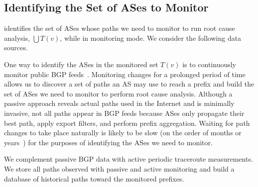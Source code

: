 \subsection{Identifying the Set of ASes to Monitor}
\label{subsec:candidates}

\ouralgo identifies the set of ASes whose paths we need to monitor to
run root cause analysis, $\bigcup{}T(v)$, while in monitoring mode. We
consider the following data sources.

 One way to
identify the ASes in the monitored set $T(v)$ is to continuously monitor
public BGP feeds~\cite{routeviews}.  Monitoring changes for a prolonged
period of time allows us to discover a set of paths an AS may use to
reach a prefix and build the set of ASes we need to monitor to perform
root cause analysis.  Although a passive approach reveals actual paths
used in the Internet and is minimally invasive, not all paths appear in
BGP feeds because ASes only propagate their best path, apply export
filters, and perform prefix aggregation.  Waiting for path
changes to take place naturally is likely to be slow (on the order of months or years~\cite{as-completeness}) 
for the purposes of identifying the ASes we need to monitor.

 We complement
passive BGP data with active periodic traceroute measurements.  We store
all paths observed with passive and active monitoring and build a
database of historical paths toward the monitored prefixes.


